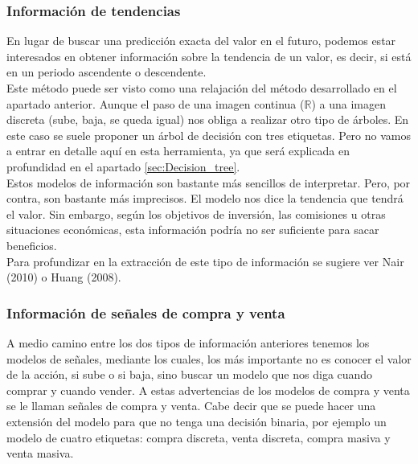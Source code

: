      
     \subsubsection{Informaci\'on de tendencias}
     
     En lugar de buscar una predicci\'on exacta del valor en el futuro, podemos estar interesados en obtener informaci\'on sobre la tendencia de un valor, es decir, si est\'a en un periodo ascendente o descendente. \\
     
     Este m\'etodo puede ser visto como una relajaci\'on del m\'etodo desarrollado en el apartado anterior. Aunque el paso de una imagen continua ($\mathbb{R}$) a una imagen discreta (sube, baja, se queda igual) nos obliga a realizar otro tipo de \'arboles. En este caso se suele proponer un \'arbol de decisi\'on con tres etiquetas. Pero no vamos a entrar en detalle aqu\'i en esta herramienta, ya que ser\'a explicada en profundidad en el apartado \ref{sec:Decision_tree}.\\
     
     Estos modelos de informaci\'on son bastante m\'as sencillos de interpretar. Pero, por contra, son bastante m\'as imprecisos. El modelo nos dice la tendencia que tendr\'a el valor. Sin embargo, seg\'un los objetivos de inversi\'on, las comisiones u otras situaciones econ\'omicas, esta informaci\'on podr\'ia no ser suficiente para sacar beneficios.\\
     
     Para profundizar en la extracci\'on de este tipo de informaci\'on se sugiere ver Nair (2010) o Huang (2008).
     
     
     \subsubsection{Informaci\'on de se\~nales de compra y venta}
     
     A medio camino entre los dos tipos de informaci\'on anteriores tenemos los modelos de señales, mediante los cuales, los m\'as importante no es conocer el valor de la acci\'on, si sube o si baja, sino buscar un modelo que nos diga cuando comprar y cuando vender. A estas advertencias de los modelos de compra y venta se le llaman se\~nales de compra y venta. Cabe decir que se puede hacer una extensi\'on del modelo para que no tenga una decisi\'on binaria, por ejemplo un modelo de cuatro etiquetas: compra discreta, venta discreta, compra masiva y venta masiva. \\
     
